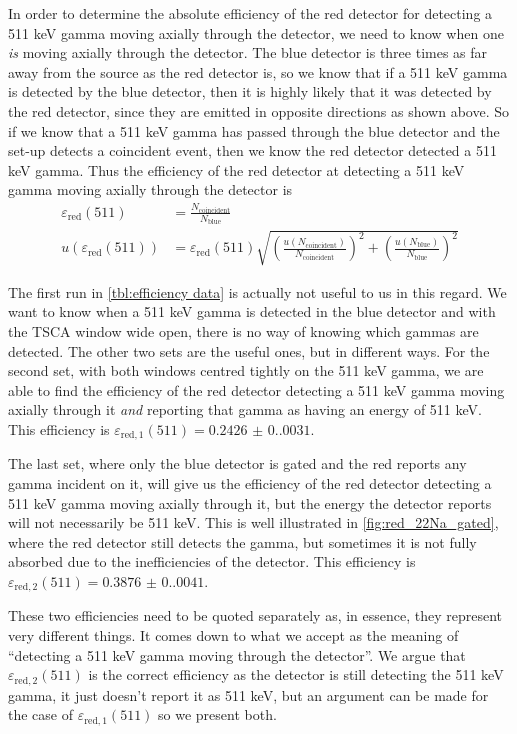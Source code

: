 \documentclass[11pt]{article}
\numberwithin{equation}{section}
\numberwithin{figure}{section}
\numberwithin{table}{section}
\begin{document}
\par In order to determine the absolute efficiency of the red detector for detecting a 511 keV gamma moving axially through the detector, we need to know when one \textit{is} moving axially through the detector. The blue detector is three times as far away from the source as the red detector is, so we know that if a 511 keV gamma is detected by the blue detector, then it is highly likely that it was detected by the red detector, since they are emitted in opposite directions as shown above. So if we know that a 511 keV gamma has passed through the blue detector and the set-up detects a coincident event, then we know the red detector detected a 511 keV gamma. Thus the efficiency of the red detector at detecting a 511 keV gamma moving axially through the detector is
\begin{align}
    \varepsilon_{\text{red}}(511)&=\frac{N_{\text{coincident}}}{N_{\text{blue}}}\label{eqn:efficiency}\\
    u(\varepsilon_{\text{red}}(511))&=\varepsilon_{\text{red}}(511)\sqrt{\left(\frac{u(N_{\text{coincident}})}{N_{\text{coincident}}}\right)^2+\left(\frac{u(N_{\text{blue}})}{N_{\text{blue}}}\right)^2}
    \label{eqn:efficiencyUn}
\end{align}
\par The first run in \cref{tbl:efficiency data} is actually not useful to us in this regard. We want to know when a 511 keV gamma is detected in the blue detector and with the TSCA window wide open, there is no way of knowing which gammas are detected. The other two sets are the useful ones, but in different ways. For the second set, with both windows centred tightly on the 511 keV gamma, we are able to find the efficiency of the red detector detecting a 511 keV gamma moving axially through it \textit{and} reporting that gamma as having an energy of 511 keV. This efficiency is $\varepsilon_{\text{red},1}(511)=\num{0.2426(0.0031)}$.
\par The last set, where only the blue detector is gated and the red reports any gamma incident on it, will give us the efficiency of the red detector detecting a 511 keV gamma moving axially through it, but the energy the detector reports will not necessarily be 511 keV. This is well illustrated in \cref{fig:red_22Na_gated}, where the red detector still detects the gamma, but sometimes it is not fully absorbed due to the inefficiencies of the detector. This efficiency is $\varepsilon_{\text{red},2}(511)=\num{0.3876(0.0041)}$. 
\par These two efficiencies need to be quoted separately as, in essence, they represent very different things. It comes down to what we accept as the meaning of ``detecting a 511 keV gamma moving through the detector''. We argue that $\varepsilon_{\text{red},2}(511)$ is the correct efficiency as the detector is still detecting the 511 keV gamma, it just doesn't report it as 511 keV, but an argument can be made for the case of $\varepsilon_{\text{red},1}(511)$ so we present both.
\end{document}
